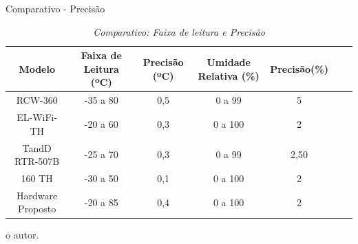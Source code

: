 \begin{frame}{Comparativo - Precisão}


\begin{table}[!h]
	
	\captionsetup{width=9cm}%
	\caption{\label{tab:compara_precisao} \textit{Comparativo: Faixa de leitura e Precisão}}%
	
		\begin{tabular}{ccccccc}
			\toprule
			Modelo & Faixa de Leitura (ºC) & Precisão (ºC) & Umidade Relativa (\%) & Precisão(\%)\\
			\midrule \midrule
           RCW-360           & -35 a 80      & 0,5 & 0 a 99 & 5    \\
           EL-WiFi-TH        & -20 a 60      & 0,3 & 0 a 100 & 2    \\
           TandD RTR-507B    & -25 a 70      & 0,3 & 0 a 99  & 2,50 \\
           160 TH            & -30 a 50      & 0,1 & 0 a 100 & 2 \\
           Hardware Proposto & -20 a 85      & 0,4 & 0 a 100 & 2\\
	    \bottomrule
		\end{tabular}%

	\tiny{o autor.}%

    \end{table}

    
\end{frame}





